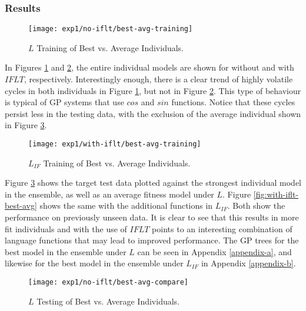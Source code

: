 \documentclass[12pt, letterpaper]{article}
\begin{document}
\subsubsection{Results}

\begin{figure}[!htb]
\begin{center}
\texttt{[image: exp1/no-iflt/best-avg-training]}
\end{center}
\caption{ $L$ Training of Best vs. Average Individuals.}
\label{fig:no-iflt-best-avg-train}
\end{figure}

\textrm{ \indent In Figures \ref{fig:no-iflt-best-avg-train} and \ref{fig:with-iflt-best-avg-train}, the entire individual models are shown for without and with $IFLT$, respectively. Interestingly enough, there is a clear trend of highly volatile cycles in both individuals in Figure \ref{fig:no-iflt-best-avg-train}, but not in Figure \ref{fig:with-iflt-best-avg-train}. This type of behaviour is typical of GP systems that use $cos$ and $sin$ functions. Notice that these cycles persist less in the testing data, with the exclusion of the average individual shown in Figure \ref{fig:no-iflt-best-avg}. }

\begin{figure}[!htb]
\begin{center}
\texttt{[image: exp1/with-iflt/best-avg-training]}
\end{center}
\caption{ $L_{IF}$ Training of Best vs. Average Individuals.}
\label{fig:with-iflt-best-avg-train}
\end{figure}

\textrm{ \indent Figure \ref{fig:no-iflt-best-avg} shows the target test data plotted against the strongest individual model in the ensemble, as well as an average fitness model under $L$. Figure \ref{fig:with-iflt-best-avg} shows the same with the additional functions in $L_{IF}$. Both show the performance on previously unseen data. It is clear to see that this results in more fit individuals and with the use of $IFLT$ points to an interesting combination of language functions that may lead to improved performance. The GP trees for the best model in the ensemble under $L$ can be seen in Appendix \ref{appendix-a}, and likewise for the best model in the ensemble under $L_{IF}$ in Appendix \ref{appendix-b}. }

\begin{figure}[!htb]
\begin{center}
\texttt{[image: exp1/no-iflt/best-avg-compare]}
\end{center}
\caption{ $L$ Testing of Best vs. Average Individuals.}
\label{fig:no-iflt-best-avg}
\end{figure}
\end{document}
